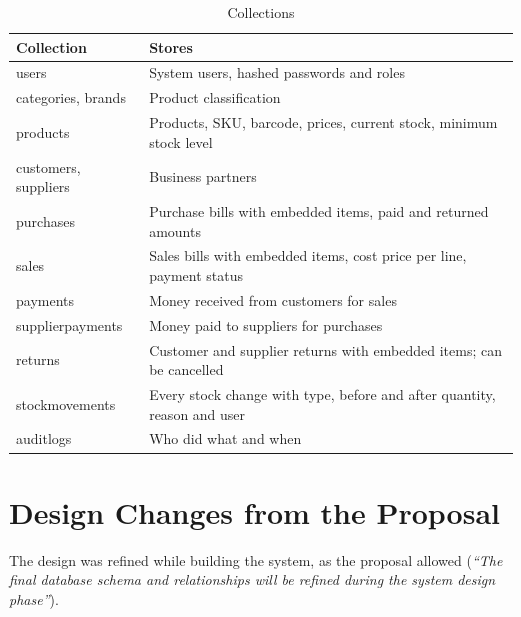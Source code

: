 \documentclass[11pt,a4paper]{article}
\begin{document}
\begin{table}[H]
  \centering
  \caption{Collections}
  \begin{tabularx}{\textwidth}{@{}lY@{}}
    \toprule
    \textbf{Collection} & \textbf{Stores} \\
    \midrule
    users & System users, hashed passwords and roles \\
    categories, brands & Product classification \\
    products & Products, SKU, barcode, prices, current stock, minimum stock level \\
    customers, suppliers & Business partners \\
    purchases & Purchase bills with embedded items, paid and returned amounts \\
    sales & Sales bills with embedded items, cost price per line, payment status \\
    payments & Money received from customers for sales \\
    supplierpayments & Money paid to suppliers for purchases \\
    returns & Customer and supplier returns with embedded items; can be cancelled \\
    stockmovements & Every stock change with type, before and after quantity, reason and user \\
    auditlogs & Who did what and when \\
    \bottomrule
  \end{tabularx}
\end{table}

\section{Design Changes from the Proposal}
The design was refined while building the system, as the proposal allowed
(\emph{``The final database schema and relationships will be refined during the system design phase''}).
\end{document}
